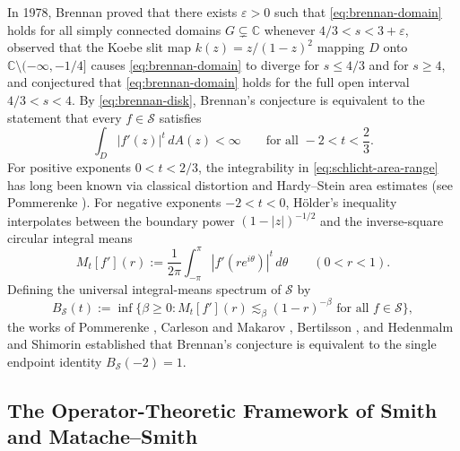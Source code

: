 \documentclass[12pt]{article}
\def\C{\mathbb{C}}
\def\S{\mathcal{S}}
\theoremstyle{definition}
\numberwithin{equation}{section}
\begin{document}
In 1978, Brennan \cite{Bre78} proved that there exists $\varepsilon > 0$ such that \eqref{eq:brennan-domain} holds for all simply connected domains $G \subsetneq \C$ whenever $4/3 < s < 3 + \varepsilon$, observed that the Koebe slit map $k(z) = z/(1-z)^2$ mapping $D$ onto $\C \setminus (-\infty, -1/4]$ causes \eqref{eq:brennan-domain} to diverge for $s \le 4/3$ and for $s \ge 4$, and conjectured that \eqref{eq:brennan-domain} holds for the full open interval $4/3 < s < 4$. By \eqref{eq:brennan-disk}, Brennan's conjecture is equivalent to the statement that every $f \in \S$ satisfies
\begin{equation}\label{eq:schlicht-area-range}
  \int_D |f'(z)|^t \, dA(z) < \infty \qquad \text{for all } -2 < t < \frac{2}{3}.
\end{equation}
For positive exponents $0 < t < 2/3$, the integrability in \eqref{eq:schlicht-area-range} has long been known via classical distortion and Hardy--Stein area estimates (see Pommerenke \cite{Pom92}). For negative exponents $-2 < t < 0$, H\"older's inequality interpolates between the boundary power $(1-|z|)^{-1/2}$ and the inverse-square circular integral means
\begin{equation}\label{eq:integral-means-def}
  M_t[f'](r) := \frac{1}{2\pi} \int_{-\pi}^{\pi} |f'(r e^{i\theta})|^t \, d\theta \qquad (0 < r < 1).
\end{equation}
Defining the universal integral-means spectrum of $\S$ by
\[
  B_{\S}(t) := \inf\Big\{\beta \ge 0 : M_t[f'](r) \lesssim_\beta (1-r)^{-\beta} \text{ for all } f \in \S\Big\},
\]
the works of Pommerenke \cite{Pom85}, Carleson and Makarov \cite{CM94}, Bertilsson \cite{Ber99}, and Hedenmalm and Shimorin \cite{HS05} established that Brennan's conjecture is equivalent to the single endpoint identity $B_{\S}(-2) = 1$.

\subsection{The Operator-Theoretic Framework of Smith and Matache--Smith}
\end{document}
